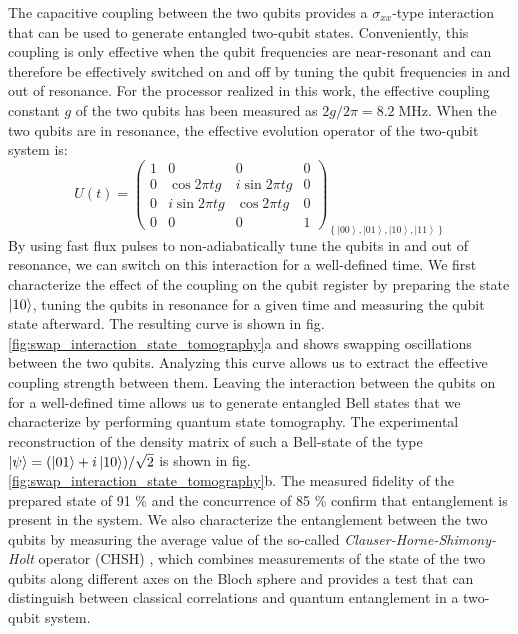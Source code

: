 The capacitive coupling between the two qubits provides a $\sigma_{xx}$-type
interaction that can be used to generate entangled two-qubit states.
Conveniently, this coupling is only effective when the qubit frequencies
are near-resonant and can therefore be effectively switched on and
off by tuning the qubit frequencies in and out of resonance. For the
processor realized in this work, the effective coupling constant $g$
of the two qubits has been measured as $2g/2\pi=8.2\;\mathrm{MHz}$.
When the two qubits are in resonance, the effective evolution operator
of the two-qubit system is:
%
\begin{equation}
U(t)=\left(\begin{array}{cccc}
1 & 0 & 0 & 0\\
0 & \cos{2\pi tg} & i\sin{2\pi tg} & 0\\
0 & i\sin{2\pi tg} & \cos{2\pi tg} & 0\\
0 & 0 & 0 & 1\end{array}\right)_{\left\{ \left|00\right\rangle ,\left|01\right\rangle ,\left|10\right\rangle ,\left|11\right\rangle \right\} } \label{eq:swap_evolution_operator}
\end{equation}
%
By using fast flux pulses to non-adiabatically tune the qubits in
and out of resonance, we can switch on this interaction for a well-defined
time. We first characterize the effect of the coupling on the qubit
register by preparing the state $\left| 10 \right>$, tuning the qubits in
resonance for a given time and measuring the qubit state afterward.
The resulting curve is shown in fig. \ref{fig:swap_interaction_state_tomography}a
and shows swapping oscillations between the two qubits. Analyzing
this curve allows us to extract the effective coupling strength between
them. Leaving the interaction between the qubits on for a well-defined
time allows us to generate entangled Bell states that we characterize
by performing quantum state tomography. The experimental reconstruction
of the density matrix of such a Bell-state of the type $\left| \psi \right>=(\left| 01 \right>+i\left| 10 \right>)/\sqrt{2}$
is shown in fig. \ref{fig:swap_interaction_state_tomography}b.
The measured fidelity of the prepared state of 91 \% and the concurrence
of 85 \% confirm that entanglement is present in the system. We also
characterize the entanglement between the two qubits by measuring the average value of the so-called \textit{Clauser-Horne-Shimony-Holt}
operator (CHSH) \citep{clauser_proposed_1969}, which
combines measurements of the state of the two qubits along different
axes on the Bloch sphere and provides a test that can distinguish
between classical correlations and quantum entanglement in a two-qubit
system.

